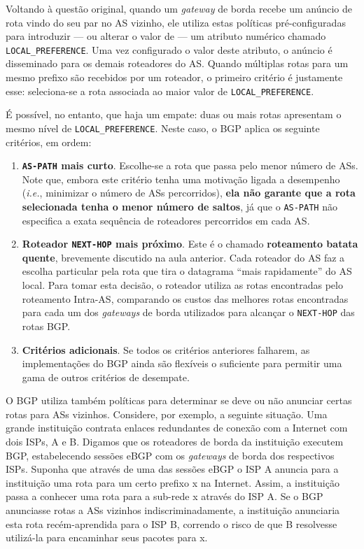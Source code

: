 \documentclass{article}
\begin{document}
Voltando à questão original, quando um \textit{gateway} de borda recebe um anúncio de rota vindo do seu par no AS vizinho, ele utiliza estas políticas pré-configuradas para introduzir --- ou alterar o valor de --- um atributo numérico chamado \texttt{LOCAL\_PREFERENCE}. Uma vez configurado o valor deste atributo, o anúncio é disseminado para os demais roteadores do AS. Quando múltiplas rotas para um mesmo prefixo são recebidos por um roteador, o primeiro critério é justamente esse: seleciona-se a rota associada ao maior valor de \texttt{LOCAL\_PREFERENCE}.

É possível, no entanto, que haja um empate: duas ou mais rotas apresentam o mesmo nível de \texttt{LOCAL\_PREFERENCE}. Neste caso, o BGP aplica os seguinte critérios, em ordem:
\begin{enumerate}
    \item \textbf{\texttt{AS-PATH} mais curto}. Escolhe-se a rota que passa pelo menor número de ASs. Note que, embora este critério tenha uma motivação ligada a desempenho (\textit{i.e.}, minimizar o número de ASs percorridos), \textbf{ela não garante que a rota selecionada tenha o menor número de saltos}, já que o \texttt{AS-PATH} não especifica a exata sequência de roteadores percorridos em cada AS.
    \item \textbf{Roteador \texttt{NEXT-HOP} mais próximo}. Este é o chamado \textbf{roteamento batata quente}, brevemente discutido na aula anterior. Cada roteador do AS faz a escolha particular pela rota que tira o datagrama ``mais rapidamente'' do AS local. Para tomar esta decisão, o roteador utiliza as rotas encontradas pelo roteamento Intra-AS, comparando os custos das melhores rotas encontradas para cada um dos \textit{gateways} de borda utilizados para alcançar o \texttt{NEXT-HOP} das rotas BGP.
    \item \textbf{Critérios adicionais}. Se todos os critérios anteriores falharem, as implementações do BGP ainda são flexíveis o suficiente para permitir uma gama de outros critérios de desempate.
\end{enumerate}

O BGP utiliza também políticas para determinar se deve ou não anunciar certas rotas para ASs vizinhos. Considere, por exemplo, a seguinte situação. Uma grande instituição contrata enlaces redundantes de conexão com a Internet com dois ISPs, A e B. Digamos que os roteadores de borda da instituição executem BGP, estabelecendo sessões eBGP com os \textit{gateways} de borda dos respectivos ISPs. Suponha que através de uma das sessões eBGP o ISP A anuncia para a instituição uma rota para um certo prefixo x na Internet. Assim, a instituição passa a conhecer uma rota para a sub-rede x através do ISP A. Se o BGP anunciasse rotas a ASs vizinhos indiscriminadamente, a instituição anunciaria esta rota recém-aprendida para o ISP B, correndo o risco de que B resolvesse utilizá-la para encaminhar seus pacotes para x.
\end{document}
